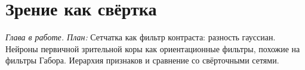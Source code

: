 \chapter{Зрение как свёртка}
\label{sec:vision}

\emph{Глава в работе. План:} Сетчатка как фильтр контраста: разность гауссиан. Нейроны первичной зрительной коры как ориентационные фильтры, похожие на фильтры Габора. Иерархия признаков и сравнение со свёрточными сетями.
